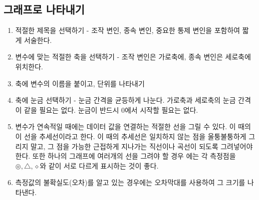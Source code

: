 \begin{flushleft}
  

\subsection{그래프로 나타내기}
    \begin{enumerate}[가.]\setlength{\itemsep}{1mm}
     \item 적절한 제목을 선택하기 - 조작 변인, 종속 변인, 중요한 통제 변인을 포함하여 짧게 서술한다. 
     \item 변수에 맞는 적절한 축을 선택하기 - 조작 변인은 가로축에, 종속 변인은 세로축에 위치한다. 
     \item 축에 변수의 이름을 붙이고, 단위를 나타내기
     \item 축에 눈금 선택하기 - 눈금 간격을 균등하게 나눈다. 가로축과 세로축의 눈금 간격이 같을 필요는 없다. 눈금이 반드시 0에서 시작할 필요는 없다.
     \item 변수가 연속적일 때에는 데이터 값을 연결하는 적절한 선을 그릴 수 있다. 이 때의 이 선을 추세선이라고 한다. 이 때의 추세선은 일치하지 않는 점을 
     울퉁불퉁하게 그리지 말고, 그 점을 가능한 근접하게 지나가는 직선이나 곡선이 되도록 그려넣어야 한다. 또한 하나의 그래프에 여러개의 선을 그려야 할 경우
     에는 각 측정점을 $\circledcirc,\bigtriangleup, \diamond$와 같이 서로 다르게 표시하는 것이 좋다.
 
     \item 측정값의 불확실도(오차)를 알고 있는 경우에는 오차막대를 사용하여 그 크기를 나타낸다.
     
    \end{enumerate}
  




\end{flushleft}